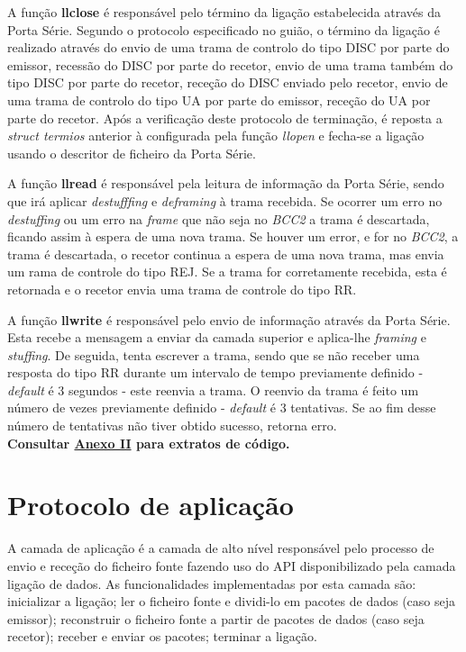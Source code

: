\documentclass[a4paper, 11pt]{article}
\begin{document}
A função \textbf{llclose} é responsável pelo término da ligação estabelecida através da Porta Série. Segundo o protocolo especificado no guião, o término da ligação é realizado através do envio de uma trama de controlo do tipo DISC por parte do emissor,  recessão do DISC por parte do recetor, envio de uma trama também do tipo DISC por parte do recetor, receção do DISC enviado pelo recetor, envio de uma trama de controlo do tipo UA por parte do emissor, receção do UA por parte do recetor. Após a verificação deste protocolo de terminação, é reposta a \textit{struct termios} anterior à configurada pela função \textit{llopen} e fecha-se a ligação usando o descritor de ficheiro da Porta Série.

A função \textbf{llread} é responsável pela leitura de informação da Porta Série, sendo que irá aplicar \textit{destufffing} e \textit{deframing} à trama recebida. Se ocorrer um erro no \textit{destuffing} ou um erro na \textit{frame} que não seja no \textit{BCC2} a trama é descartada, ficando assim à espera de uma nova trama. Se houver um error, e for no \textit{BCC2}, a trama é descartada, o recetor continua a espera de uma nova trama, mas envia um rama de controle do tipo REJ. Se a trama for corretamente recebida, esta é retornada e o recetor envia uma trama de controle do tipo RR.

A função \textbf{llwrite} é responsável pelo envio de informação através da Porta Série. Esta recebe a mensagem a enviar da camada superior e aplica-lhe \textit{framing} e \textit{stuffing}.
De seguida, tenta escrever a trama, sendo que se não receber uma resposta do tipo RR durante um intervalo de tempo previamente definido - \textit{default} é 3 segundos - este reenvia a trama. O reenvio da trama é feito um número de vezes previamente definido - \textit{default} é 3 tentativas. Se ao fim desse número de tentativas não tiver obtido sucesso, retorna erro.\\

\textbf{Consultar \underline{Anexo II} para extratos de código.}

\section{Protocolo de aplicação}

A camada de aplicação é a camada de alto nível responsável pelo processo de envio e receção do ficheiro fonte fazendo uso do API disponibilizado pela camada ligação de dados. As funcionalidades implementadas por esta camada são: inicializar a ligação; ler o ficheiro fonte e dividi-lo em pacotes de dados (caso seja emissor); reconstruir o ficheiro fonte a partir de pacotes de dados (caso seja recetor); receber e enviar os pacotes; terminar a ligação.\\
\end{document}
